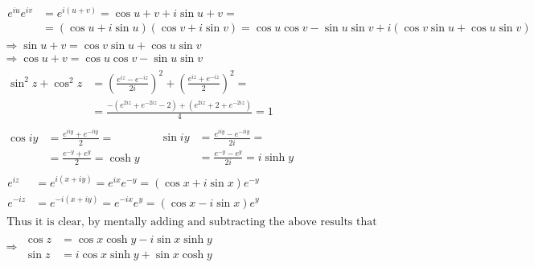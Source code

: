 \documentclass[twoside]{amsart}
\theoremstyle{plain}
\theoremstyle{definition}
\newcommand{\exercisehead}[1]
  {\smallskip
   \noindent{\small\bf Exercise #1.}}
\begin{document}
\exercisehead{9}
\[
\begin{gathered}
\begin{aligned}
  e^{iu}e^{iv} & = e^{i(u+v)} = \cos{u+v} + i \sin{u+v} = \\
  & = (\cos{u}+i\sin{u})(\cos{v}+i\sin{v}) = \cos{u}\cos{v} - \sin{u}\sin{v} + i ( \cos{v}\sin{u} + \cos{u}\sin{v}) 
\end{aligned} \\
\Longrightarrow \sin{ u +v} = \cos{v}\sin{u} + \cos{u}\sin{v} \\
\Longrightarrow \cos{u+v} = \cos{u}\cos{v} - \sin{u}\sin{v} \\
\begin{aligned}
  \sin^2{z} + \cos^2{z} & = \left( \frac{ e^{iz} - e^{-iz} }{ 2i } \right)^2 + \left(  \frac{ e^{iz} + e^{-iz} }{ 2 } \right)^2 = \\
  & = \frac{ -(e^{2iz} + e^{-2iz} -2) + (e^{2iz} + 2 + e^{-2iz} ) }{ 4} = 1 
\end{aligned} \\
\begin{aligned}
  \cos{iy} & = \frac{ e^{i iy} + e^{-i iy }}{ 2 } = \\
  & = \frac{ e^{-y} + e^{y}}{ 2 } = \cosh{y} 
\end{aligned} \quad
\begin{aligned}
  \sin{iy} & = \frac{ e^{i iy } - e^{ -i iy }}{ 2 i } = \\
  & = \frac{ e^{-y} - e^{ y }}{ 2 i } = i \sinh{y}
\end{aligned} \\
\begin{aligned}
  e^{iz} & = e^{i (x+iy)} = e^{ix}e^{-y} = (\cos{x} + i \sin{x})e^{-y} \\
  e^{-iz} & = e^{-i (x+iy)} = e^{-ix}e^{y} = (\cos{x} - i \sin{x})e^{y}    
\end{aligned} \\
\text{ Thus it is clear, by mentally adding and subtracting the above results that  } \\
\Longrightarrow \begin{aligned}
  \cos{z} & = \cos{x} \cosh{y} - i \sin{x} \sinh{y} \\
  \sin{z} & = i \cos{x} \sinh{y}  + \sin{x} \cosh{y}
\end{aligned}
\end{gathered}
\]
 


\end{document}
